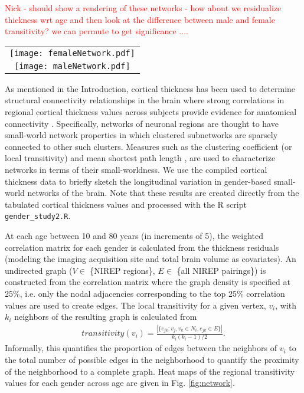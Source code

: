\textcolor{red}{ Nick - should show a rendering of these networks -
  how about we residualize thickness wrt age and then look at the
  difference between male and female transitivity?  we can permute to
  get significance .... } 

\begin{figure*}
  \centering
  \begin{tabular}{c}
  \texttt{[image: femaleNetwork.pdf]} \\
  \texttt{[image: maleNetwork.pdf]}
  \end{tabular}
  \caption{Transitivity (clustering coefficient) values across age for both the female (top)
  and male (bottom) networks.  
  }
  \label{fig:network}
\end{figure*}

As mentioned in the Introduction, cortical thickness has
been used to determine structural connectivity relationships in the brain 
where strong correlations in regional cortical 
thickness values across subjects provide evidence for anatomical
connectivity \citep{he2007,chen2008,he2008}.  Specifically, networks of neuronal
regions are thought to have small-world network properties \citep{sporns2004} 
in which clustered subnetworks are sparsely connected to other such clusters.
Measures such as the
clustering coefficient (or local transitivity) and mean shortest path length
\citep{watts1998}, are used to characterize networks in terms of their 
small-worldness.
We use the compiled cortical thickness data to briefly sketch
the longitudinal variation in gender-based small-world networks of the
brain.  Note that these results are created directly from the tabulated 
cortical thickness values and processed with the R script
\verb#gender_study2.R#.

At each age between 10 and 80 years (in increments of 5), the weighted correlation
matrix for each gender is calculated from the thickness residuals 
(modeling the imaging acquisition site and total brain volume as covariates).  An undirected graph ($V \in$ \{NIREP regions\}, $E \in$ \{all NIREP pairings\})
is constructed from the correlation matrix where the graph density is specified at 25\%, i.e. only the nodal adjacencies corresponding to the top 25\% correlation values are used to create edges.    The local transitivity for a given vertex, $v_i$, with $k_i$ neighbors of the resulting graph is calculated from
\begin{align}
  transitivity(v_i) = \frac{|\{e_{jk}: v_j, v_k \in N_i, e_{jk} \in E \}|}{k_i (k_i-1)/2}.
\end{align}
Informally, this quantifies the proportion of edges between the neighbors of $v_i$ to the total number of possible edges in the neighborhood to quantify the proximity of the neighborhood to a complete graph.  Heat maps of the regional transitivity values for each
gender across age are given in Fig. \ref{fig:network}.  


